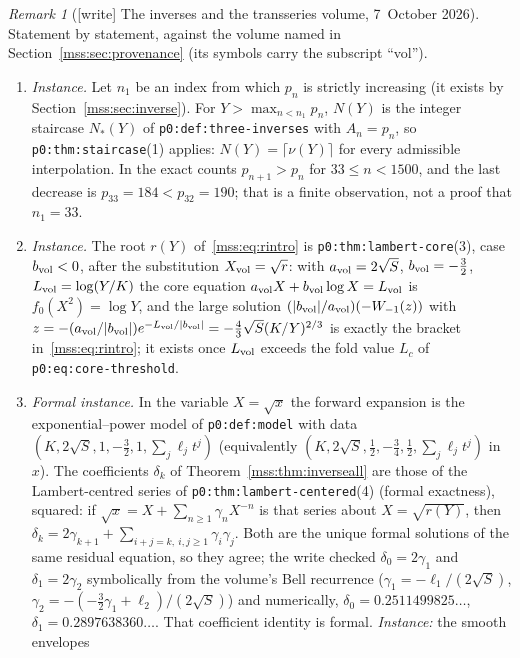 \documentclass[11pt,letterpaper]{article}
\numberwithin{equation}{section}
\theoremstyle{definition}\newtheorem{definition}[theorem]{Definition}
\theoremstyle{remark}\newtheorem{remark}[theorem]{Remark}
\newcommand{\file}[1]{\nolinkurl{#1}}
\begin{document}
\begin{remark}[{[write]} The inverses and the transseries volume, 7~October 2026]\label{mss:rem:transseries}
Statement by statement, against the volume named in
Section~\ref{mss:sec:provenance} (its symbols carry the subscript ``vol'').
\begin{enumerate}[label=(\alph*),leftmargin=*]
\item \emph{Instance.} Let $n_1$ be an index from which $p_n$ is strictly
increasing (it exists by Section~\ref{mss:sec:inverse}). For
$Y>\max_{n<n_1}p_n$, $N(Y)$ is the integer staircase $N_*(Y)$ of
\file{p0:def:three-inverses} with $A_n=p_n$, so
\file{p0:thm:staircase}(1) applies: $N(Y)=\lceil\nu(Y)\rceil$ for every
admissible interpolation. In the exact counts $p_{n+1}>p_n$ for
$33\le n<1500$, and the last decrease is $p_{33}=184<p_{32}=190$; that is a
finite observation, not a proof that $n_1=33$.
\item \emph{Instance.} The root $r(Y)$ of~\eqref{mss:eq:rintro} is
\file{p0:thm:lambert-core}(3), case $b_{\rm vol}<0$, after the substitution
$X_{\rm vol}=\sqrt r$: with $a_{\rm vol}=2\sqrt S$, $b_{\rm vol}=-\tfrac32$,
$L_{\rm vol}=\log(Y/K)$ the core equation $a_{\rm vol}X+b_{\rm vol}\log X=
L_{\rm vol}$ is $f_0(X^2)=\log Y$, and the large solution
$(|b_{\rm vol}|/a_{\rm vol})(-W_{-1}(z))$ with
$z=-(a_{\rm vol}/|b_{\rm vol}|)e^{-L_{\rm vol}/|b_{\rm vol}|}=
-\tfrac43\sqrt S(K/Y)^{2/3}$ is exactly the bracket
in~\eqref{mss:eq:rintro}; it exists once $L_{\rm vol}$ exceeds the fold
value $L_c$ of \file{p0:eq:core-threshold}.
\item \emph{Formal instance.} In the variable $X=\sqrt x$ the forward
expansion is the exponential--power model of \file{p0:def:model} with data
$(K,2\sqrt S,1,-\tfrac32,1,\sum_j\ell_jt^j)$ (equivalently
$(K,2\sqrt S,\tfrac12,-\tfrac34,\tfrac12,\sum_j\ell_jt^j)$ in $x$). The
coefficients $\delta_k$ of Theorem~\ref{mss:thm:inverseall} are those of the
Lambert-centred series of \file{p0:thm:lambert-centered}(4) (formal exactness), squared: if
$\sqrt x=X+\sum_{n\ge1}\gamma_nX^{-n}$ is that series about $X=\sqrt{r(Y)}$,
then $\delta_k=2\gamma_{k+1}+\sum_{i+j=k,\ i,j\ge1}\gamma_i\gamma_j$. Both
are the unique formal solutions of the same residual equation, so they
agree; the write checked $\delta_0=2\gamma_1$ and $\delta_1=2\gamma_2$
symbolically from the volume's Bell recurrence ($\gamma_1=-\ell_1/(2\sqrt
S)$, $\gamma_2=-(-\tfrac32\gamma_1+\ell_2)/(2\sqrt S)$) and numerically,
$\delta_0=0.2511499825\ldots$, $\delta_1=0.2897638360\ldots$. That
coefficient identity is formal. \emph{Instance:} the smooth envelopes

\end{enumerate}
\end{remark}
\end{document}
